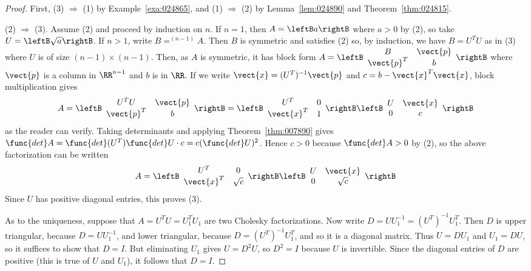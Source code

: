 \begin{proof}
First, (3) $\Rightarrow$ (1) by Example~\ref{exa:024865}, and (1) $\Rightarrow$ (2) by Lemma~\ref{lem:024890} and Theorem~\ref{thm:024815}. 

(2) $\Rightarrow$ (3). Assume (2) and proceed by induction on $n$. If $n = 1$, then $A = \leftB a \rightB$ where $a > 0$ by (2), so take $U = \leftB \sqrt{a} \rightB$. If $n > 1$, write $B =^{(n-1)}A$. Then $B$ is symmetric and satisfies (2) so, by induction, we have $B = U^{T}U$ as in (3) where $U$ is of size $(n - 1) \times (n - 1)$. Then, as $A$ is symmetric, it has block form $A = \leftB \begin{array}{cc}
B & \vect{p} \\
\vect{p}^T & b
\end{array}\rightB$ where $\vect{p}$ is a column in $\RR^{n-1}$ and $b$ is in $\RR$. If we write $\vect{x} = (U^{T})^{-1}\vect{p}$ and $c = b - \vect{x}^{T}\vect{x}$, block multiplication gives
\begin{equation*}
A = \leftB \begin{array}{cc}
U^TU & \vect{p} \\
\vect{p}^T & b
\end{array}\rightB = \leftB \begin{array}{cc}
U^T & 0 \\
\vect{x}^T & 1
\end{array}\rightB \leftB \begin{array}{cc}
U & \vect{x} \\
0 & c
\end{array}\rightB
\end{equation*}
as the reader can verify. Taking determinants and applying Theorem~\ref{thm:007890} gives $\func{det}A = \func{det}(U^{T}) \func{det} U \cdot c = c(\func{det}U)^{2}$. Hence $c > 0$ because $\func{det}A > 0$ by (2), so the above factorization can be written 
\begin{equation*}
A = \leftB \begin{array}{cc}
U^T & 0 \\
\vect{x}^T & \sqrt{c}
\end{array}\rightB \leftB \begin{array}{cc}
U & \vect{x} \\
0 & \sqrt{c}
\end{array}\rightB
\end{equation*}
Since $U$ has positive diagonal entries, this proves (3).

As to the uniqueness, suppose that $A = U^TU = U_{1}^TU_{1}$ are two Cholesky factorizations. Now write $D = UU_{1}^{-1} = (U^T)^{-1}U_{1}^T$. Then $D$ is upper triangular, because $D = UU_{1}^{-1}$, and lower triangular, because $D = (U^T)^{-1}U_{1}^T$, and so it is a diagonal matrix. Thus $U = DU_{1}$ and $U_{1} = DU$, so it suffices to show that $D = I$. But eliminating $U_{1}$ gives $U = D^{2}U$, so $D^{2} = I$ because $U$ is invertible. Since the diagonal entries of $D$ are positive (this is true of $U$ and $U_{1}$), it follows that $D = I$.
\end{proof}

